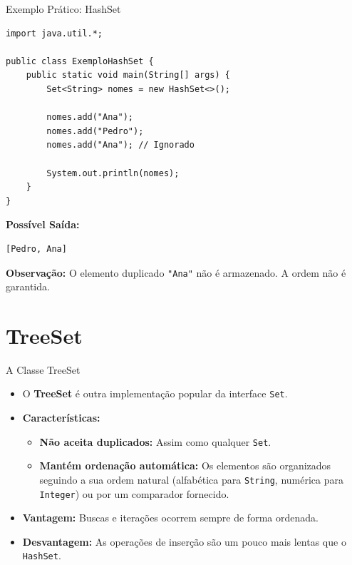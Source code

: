 \documentclass[9pt]{beamer}
\begin{document}
\begin{frame}[fragile]{Exemplo Prático: HashSet}
    \begin{lstlisting}
import java.util.*;

public class ExemploHashSet {
    public static void main(String[] args) {
        Set<String> nomes = new HashSet<>();

        nomes.add("Ana");
        nomes.add("Pedro");
        nomes.add("Ana"); // Ignorado

        System.out.println(nomes);
    }
}
    \end{lstlisting}
    \textbf{Possível Saída:}
    \begin{lstlisting}[numbers=none, backgroundcolor=\color{white}]
[Pedro, Ana]
    \end{lstlisting}
    \vspace{0.1cm}
    \small{\textbf{Observação:} O elemento duplicado \texttt{"Ana"} não é armazenado. A ordem não é garantida.}
\end{frame}

\section{TreeSet}

\begin{frame}{A Classe TreeSet}
    \begin{itemize}
        \item O \textbf{TreeSet} é outra implementação popular da interface \texttt{Set}.
        \item \textbf{Características:}
        \begin{itemize}
            \item \textbf{Não aceita duplicados:} Assim como qualquer \texttt{Set}.
            \item \textbf{Mantém ordenação automática:} Os elementos são organizados seguindo a sua ordem natural (alfabética para \texttt{String}, numérica para \texttt{Integer}) ou por um comparador fornecido.
        \end{itemize}
        \item \textbf{Vantagem:} Buscas e iterações ocorrem sempre de forma ordenada.
        \item \textbf{Desvantagem:} As operações de inserção são um pouco mais lentas que o \texttt{HashSet}.
    \end{itemize}
\end{frame}
\end{document}

